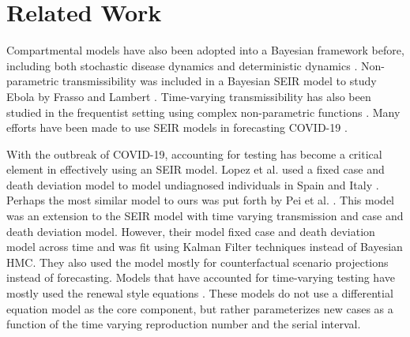 \documentclass{umassthesis}          %
\begin{document}
\section{Related Work}


Compartmental models have also been adopted into a Bayesian framework before, including both stochastic disease dynamics and deterministic dynamics \cite{hotta2010bayesian}\cite{dukic2012tracking}. Non-parametric transmissibility was included in a Bayesian SEIR model to study Ebola by Frasso and Lambert \cite{frasso2016bayesian}. Time-varying transmissibility has also been studied in the frequentist setting using complex non-parametric functions \cite{smirnova2019forecasting}. Many efforts have been made to use SEIR models in forecasting COVID-19 \cite{giordano2020modelling}\cite{yang2020modified} \cite{bertozzi2020challenges}\cite{prem2020effect}\cite{flaxman2020estimating}.

With the outbreak of COVID-19, accounting for testing has become a critical element in effectively using an SEIR model. Lopez et al. used a fixed case and death deviation model to model undiagnosed individuals in Spain and Italy \cite{lopez2020modified}.  Perhaps the most similar model to ours was put forth by Pei et al. \cite{pei2020differential}. This model was an extension to the SEIR model with time varying transmission and case and death deviation model. However, their model fixed case and death deviation model across time and was fit using Kalman Filter techniques instead of Bayesian HMC. They also used the model mostly for counterfactual scenario projections instead of forecasting. Models that have accounted for time-varying testing have mostly used the renewal style equations \cite{abbott2020estimating}\cite{flaxman2020estimating}. These models do not use a differential equation model as the core component, but rather parameterizes new cases as a function of the time varying reproduction number and the serial interval. 
\end{document}
